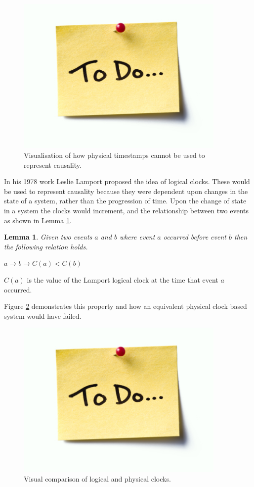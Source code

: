 \documentclass[12pt]{article}
\newtheorem{lemma}{Lemma}
\begin{document}
\begin{figure}[H]
  \centering
  \includegraphics[width=4in]{todo}
  \caption[]{Visualisation of how physical timestamps cannot be used to represent causality.}
  \label{PhysicalTimestamps}
\end{figure}

In his 1978 work  \cite{lamport1978time} Leslie Lamport proposed the idea of logical clocks. These would be used to represent causality because they were dependent upon changes in the state of a system, rather than the progression of time. Upon the change of state in a system the clocks would increment, and the relationship between two events as shown in Lemma \ref{LogicalOrderingLemma}.

\begin{lemma}
Given two events $a$ and $b$ where event $a$ occurred before event $b$ then the following relation holds.

$a \rightarrow b \longrightarrow C(a) < C(b)$
\label{LogicalOrderingLemma}
\end{lemma}
$C(a)$ is the value of the Lamport logical clock at the time that event $a$ occurred.
\newline

 Figure \ref{LogicalTimestamps} demonstrates this property and how an equivalent physical clock based system would have failed.

\begin{figure}[H]
  \centering
  \includegraphics[width=4in]{todo}
  \caption[]{Visual comparison of logical and physical clocks.}
  \label{LogicalTimestamps}
\end{figure}
\end{document}
